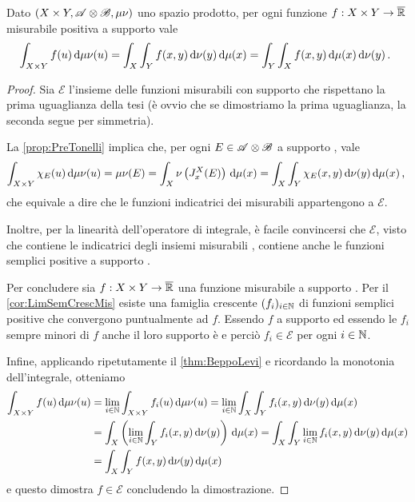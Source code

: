 \begin{theorem}[Tonelli]\label{thm:Tonelli}
	Dato $(X\times Y,\mathscr A\otimes\mathscr B,\mu\nu)$ uno spazio prodotto, per ogni funzione $f:X\times Y\to\overline{\mathbb R}$ misurabile positiva a supporto \sigfin[o] vale
	\begin{equation*}
		\int_{X\times Y}f(u)\,\mathrm d\mu\nu(u)=\int_X\int_Y f(x,y)\,\mathrm d\nu(y)\,\mathrm d\mu(x)=\int_Y\int_X f(x,y)\,\mathrm d\mu(x)\,\mathrm d\nu(y)\, \text{. }
	\end{equation*}
\end{theorem}
\begin{proof}
	\newcommand{\E}{\ensuremath{\mathscr E}}
	Sia $\E$ l'insieme delle funzioni misurabili con supporto \sigfin[o] che rispettano la prima uguaglianza della tesi (è ovvio che se dimostriamo la prima uguaglianza, la seconda segue per simmetria).
	
	La \cref{prop:PreTonelli} implica che, per ogni $E\in\mathscr A\otimes\mathscr B$ a supporto \sigfin[o], vale
	\begin{equation*}
		\int_{X\times Y}\chi_E(u)\,\mathrm d\mu\nu(u)=\mu\nu(E)=\int_X\nu\left(J_x^X(E)\right)\,\mathrm d\mu(x)=\int_X\int_Y\chi_E(x,y)\,\mathrm d\nu(y)\,\mathrm d\mu(x)\, \text{, }
	\end{equation*}
	che equivale a dire che le funzioni indicatrici dei misurabili \sigfin[i] appartengono a $\E$.
	
	Inoltre, per la linearità dell'operatore di integrale, è facile convincersi che $\E$, visto che contiene le indicatrici degli insiemi misurabili \sigfin[i], contiene anche le funzioni semplici positive a supporto \sigfin[o].
	
	Per concludere sia $f:X\times Y\to\overline{\mathbb R}$ una funzione misurabile a supporto \sigfin[o].
	Per il \cref{cor:LimSemCrescMis} esiste una famiglia crescente $(f_i)_{i\in\mathbb N}$ di funzioni semplici positive che convergono puntualmente ad $f$. Essendo $f$ a supporto \sigfin[o] ed essendo le $f_i$ sempre minori di $f$ anche il loro supporto è \sigfin[o] e perciò $f_i\in\E$ per ogni $i\in\mathbb N$.
	
	Infine, applicando ripetutamente il \cref{thm:BeppoLevi} e ricordando la monotonia dell'integrale, otteniamo
	\begin{align*}
		\int_{X\times Y}f(u)\,\mathrm d\mu\nu(u)
		&=\lim_{i\in\mathbb N}\int_{X\times Y}f_i(u)\,\mathrm d\mu\nu(u)
		=\lim_{i\in\mathbb N}\int_X\int_Y f_i(x,y)\,\mathrm d\nu(y)\,\mathrm d\mu(x)\\
		&=\int_X\left(\lim_{i\in\mathbb N}\int_Y f_i(x,y)\,\mathrm d\nu(y)\right)\,\mathrm d\mu(x)
		=\int_X\int_Y\lim_{i\in\mathbb N} f_i(x,y)\,\mathrm d\nu(y)\,\mathrm d\mu(x)\\
		&=\int_X\int_Y f(x,y)\,\mathrm d\nu(y)\,\mathrm d\mu(x)
	\end{align*}
	e questo dimostra $f\in\E$ concludendo la dimostrazione.
\end{proof}


